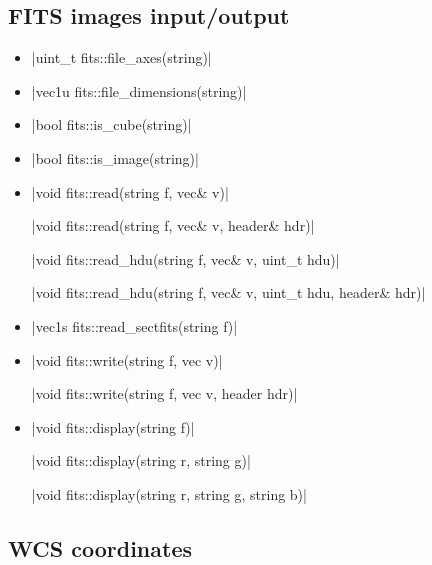 \documentclass[12pt]{report}
\begin{document}
\subsection{FITS images input/output \label{SEC:support:fits:image}}

\begin{itemize}
\item \cppinline|uint_t fits::file_axes(string)| 

\item \cppinline|vec1u fits::file_dimensions(string)| 

\item \cppinline|bool fits::is_cube(string)| 

\item \cppinline|bool fits::is_image(string)| 

\item \cppinline|void fits::read(string f, vec& v)| 

\cppinline|void fits::read(string f, vec& v, header& hdr)|

\cppinline|void fits::read_hdu(string f, vec& v, uint_t hdu)| 

\cppinline|void fits::read_hdu(string f, vec& v, uint_t hdu, header& hdr)|

\item \cppinline|vec1s fits::read_sectfits(string f)| 

\item \cppinline|void fits::write(string f, vec v)| 

\cppinline|void fits::write(string f, vec v, header hdr)|

\item \cppinline|void fits::display(string f)| 

\cppinline|void fits::display(string r, string g)|

\cppinline|void fits::display(string r, string g, string b)|

\end{itemize}

\subsection{WCS coordinates \label{SEC:support:fits:wcs}}
\end{document}

